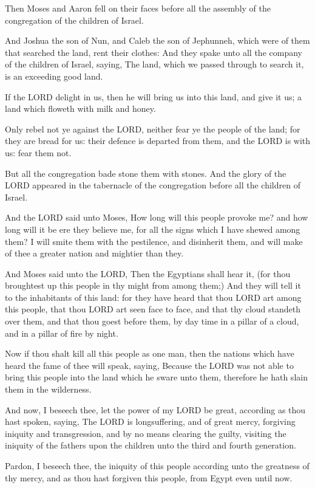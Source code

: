 \verse Then Moses and Aaron fell on their faces before all the assembly
of the congregation of the children of Israel.

\verse And Joshua the son of Nun, and Caleb the son of Jephunneh, which
were of them that searched the land, rent their clothes: \verse And they
spake unto all the company of the children of Israel, saying, The
land, which we passed through to search it, is an exceeding good land.

\verse If the LORD delight in us, then he will bring us into this land,
and give it us; a land which floweth with milk and honey.

\verse Only rebel not ye against the LORD, neither fear ye the people of
the land; for they are bread for us: their defence is departed from
them, and the LORD is with us: fear them not.

\verse But all the congregation bade stone them with stones. And the
glory of the LORD appeared in the tabernacle of the congregation
before all the children of Israel.

\verse And the LORD said unto Moses, How long will this people provoke
me?  and how long will it be ere they believe me, for all the signs
which I have shewed among them?  \verse I will smite them with the
pestilence, and disinherit them, and will make of thee a greater
nation and mightier than they.

\verse And Moses said unto the LORD, Then the Egyptians shall hear it,
(for thou broughtest up this people in thy might from among them;)
\verse And they will tell it to the inhabitants of this land: for they
have heard that thou LORD art among this people, that thou LORD art
seen face to face, and that thy cloud standeth over them, and that
thou goest before them, by day time in a pillar of a cloud, and in a
pillar of fire by night.

\verse Now if thou shalt kill all this people as one man, then the
nations which have heard the fame of thee will speak, saying, \verse
Because the LORD was not able to bring this people into the land which
he sware unto them, therefore he hath slain them in the wilderness.

\verse And now, I beseech thee, let the power of my LORD be great,
according as thou hast spoken, saying, \verse The LORD is
longsuffering, and of great mercy, forgiving iniquity and
transgression, and by no means clearing the guilty, visiting the
iniquity of the fathers upon the children unto the third and fourth
generation.

\verse Pardon, I beseech thee, the iniquity of this people according
unto the greatness of thy mercy, and as thou hast forgiven this
people, from Egypt even until now.

